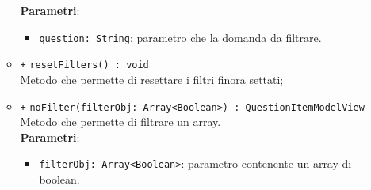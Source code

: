 \begin{itemize}
\begin{itemize}
		\textbf{Parametri}:
		\begin{itemize}
			\item \texttt{question: String}: parametro che la domanda da filtrare.
		\end{itemize}
		\item \texttt{+} \texttt{resetFilters() : void} \\
		Metodo che permette di resettare i filtri finora settati;\\
		\item \texttt{+} \texttt{noFilter(filterObj: Array<Boolean>) : QuestionItemModelView} \\
		Metodo che permette di filtrare un array.\\
		\textbf{Parametri}:
		\begin{itemize}
			\item \texttt{filterObj: Array<Boolean>}: parametro contenente un array di boolean.
		\end{itemize}
	\end{itemize}
\end{itemize}

